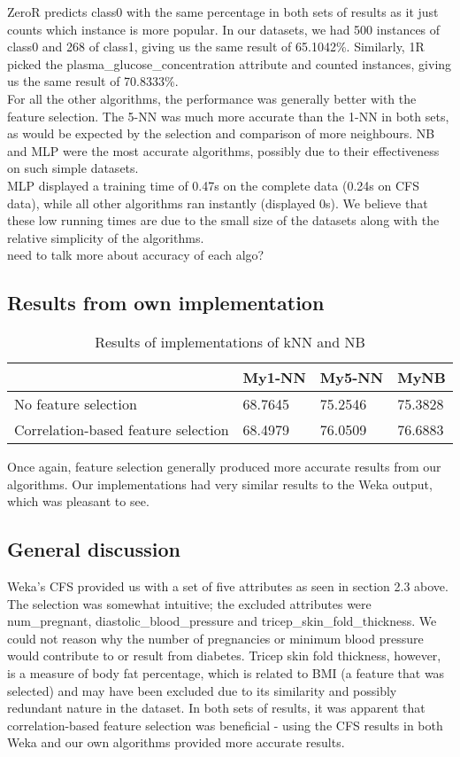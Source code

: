 \documentclass{article}
\begin{document}
ZeroR predicts class0 with the same percentage in both sets of results as it just counts which instance is more popular. In our datasets, we had 500 instances of class0 and 268 of class1, giving us the same result of 65.1042\%. Similarly, 1R picked the plasma\_glucose\_concentration attribute and counted instances, giving us the same result of 70.8333\%. \\
For all the other algorithms, the performance was generally better with the feature selection. The 5-NN was much more accurate than the 1-NN in both sets, as would be expected by the selection and comparison of more neighbours. NB and MLP were the most accurate algorithms, possibly due to their effectiveness on such simple datasets.  \\
MLP displayed a training time of 0.47s on the complete data (0.24s on CFS data), while all other algorithms ran instantly (displayed 0s). We believe that these low running times are due to the small size of the datasets along with the relative simplicity of the algorithms.  \\

need to talk more about accuracy of each algo? 

\subsection{Results from own implementation}
\begin{table}[h]
\begin{tabular}{@{}llll@{}}
\hline
 									& My1-NN & My5-NN & MyNB \\ \hline
No feature selection 					& 68.7645 & 75.2546 & 75.3828 \\
Correlation-based feature selection 	& 68.4979 & 76.0509 & 76.6883 \\ \hline
\end{tabular}
\caption {Results of implementations of kNN and NB}
\end{table}

Once again, feature selection generally produced more accurate results from our algorithms. Our implementations had very similar results to the Weka output, which was pleasant to see. 

\subsection{General discussion}
Weka's CFS provided us with a set of five attributes as seen in section 2.3 above. The selection was somewhat intuitive; the excluded attributes were num\_pregnant, diastolic\_blood\_pressure and tricep\_skin\_fold\_thickness. We could not reason why the number of pregnancies or minimum blood pressure would contribute to or result from diabetes. Tricep skin fold thickness, however, is a measure of body fat percentage, which is related to BMI (a feature that was selected) and may have been excluded due to its similarity and possibly redundant nature in the dataset.
In both sets of results, it was apparent that correlation-based feature selection was beneficial - using the CFS results in both Weka and our own algorithms provided more accurate results.  \\
\end{document}
